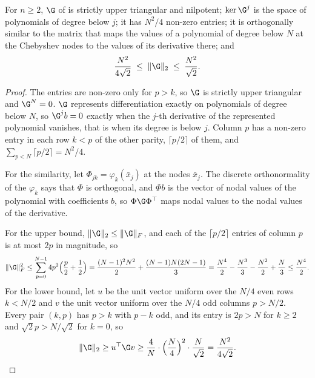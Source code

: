 \begin{proposition}
\label{prop:G-structure}
For $n\ge2$, $\G$ of  is strictly upper triangular and nilpotent; $\ker\G^j$ is the space of polynomials of degree below $j$; it has $N^2/4$ non-zero entries; it is orthogonally similar to the matrix that maps the values of a polynomial of degree below $N$ at the Chebyshev nodes to the values of its derivative there; and
\begin{equation}
    \frac{N^2}{4\sqrt2}\;\le\;\|\G\|_2\;\le\;\frac{N^2}{\sqrt2}.
    \label{eq:app-G-bounds}
\end{equation}
\end{proposition}
\begin{proof}
The entries are non-zero only for $p>k$, so $\G$ is strictly upper triangular and $\G^N=0$. $\G$ represents differentiation exactly on polynomials of degree below $N$, so $\G^jb=0$ exactly when the $j$-th derivative of the represented polynomial vanishes, that is when its degree is below $j$. Column $p$ has a non-zero entry in each row $k<p$ of the other parity, $\lceil p/2\rceil$ of them, and $\sum_{p<N}\lceil p/2\rceil=N^2/4$.

For the similarity, let $\Phi_{jk}=\varphi_k(\bar x_j)$ at the nodes $\bar x_j$. The discrete orthonormality of the $\varphi_k$ says that $\Phi$ is orthogonal, and $\Phi b$ is the vector of nodal values of the polynomial with coefficients $b$, so $\Phi\G\Phi^{\top}$ maps nodal values to the nodal values of the derivative.

For the upper bound, $\|\G\|_2\le\|\G\|_F$, and each of the $\lceil p/2\rceil$ entries of column $p$ is at most $2p$ in magnitude, so
\begin{equation*}
    \|\G\|_F^2\le\sum_{p=0}^{N-1}4p^2\Bigl(\frac p2+\frac12\Bigr)=\frac{(N-1)^2N^2}{2}+\frac{(N-1)N(2N-1)}{3}=\frac{N^4}{2}-\frac{N^3}{3}-\frac{N^2}{2}+\frac N3\le\frac{N^4}{2}.
\end{equation*}
For the lower bound, let $u$ be the unit vector uniform over the $N/4$ even rows $k<N/2$ and $v$ the unit vector uniform over the $N/4$ odd columns $p>N/2$. Every pair $(k,p)$ has $p>k$ with $p-k$ odd, and its entry is $2p>N$ for $k\ge2$ and $\sqrt2p>N/\sqrt2$ for $k=0$, so
\begin{equation*}
    \|\G\|_2\ge u^{\top}\G v\ge\frac{4}{N}\cdot\Bigl(\frac N4\Bigr)^2\cdot\frac{N}{\sqrt2}=\frac{N^2}{4\sqrt2}. \qedhere
\end{equation*}
\end{proof}

